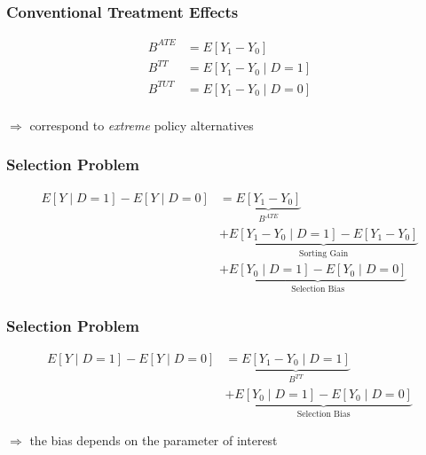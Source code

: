 

\begin{frame}
\frametitle{Conventional Treatment Effects}

\begin{align*}
B^{ATE} & = E[Y_1 - Y_0 ]\\
B^{TT} & = E[Y_1 - Y_0 \mid D = 1]\\
B^{TUT} & = E[Y_1 - Y_0 \mid D = 0]\\
\end{align*}

\(\Rightarrow\) correspond to \emph{extreme} policy alternatives

\end{frame}


\begin{frame}
\frametitle{Selection Problem}

\begin{align*}
E[Y\mid D = 1] - E[Y\mid D = 0] & = \underbrace{E[Y_1 - Y_0]}_{B^{ATE}} \\
	 							& + \underbrace{E[Y_1 - Y_0 \mid D = 1] - E[Y_1 - Y_0]}_{\text{Sorting Gain}} \\
								& + \underbrace{E[Y_0\mid D = 1] - E[Y_0 \mid D = 0]}_{\text{Selection Bias}}
\end{align*}

\end{frame}


\begin{frame}
\frametitle{Selection Problem}

\begin{align*}
E[Y\mid D = 1] - E[Y\mid D = 0] & = \underbrace{E[Y_1 - Y_0\mid D = 1]}_{B^{TT}} \\
& + \underbrace{E[Y_0\mid D= 1]- E[Y_0 \mid D = 0]}_{\text{Selection Bias}}
\end{align*}

\(\Rightarrow\) the bias depends on the parameter of interest

\end{frame}


